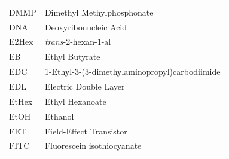 \documentclass[
  a4paper,
]{scrbook}
\begin{document}
\begin{table}[H]
\begin{tabular}{@{}p{} p{}@{}}
    DMMP  & Dimethyl Methylphosphonate  \\[5pt]
    DNA  & Deoxyribonucleic Acid  \\[5pt]
    E2Hex  & \textit{trans}-2-hexan-1-al  \\[5pt]
    EB  & Ethyl Butyrate  \\[5pt]
    EDC  & 1-Ethyl-3-(3-dimethylaminopropyl)carbodiimide  \\[5pt]
    EDL  & Electric Double Layer  \\[5pt]
    EtHex  & Ethyl Hexanoate  \\[5pt]
    EtOH  & Ethanol  \\[5pt]
    FET  & Field-Effect Transistor  \\[5pt]
    FITC  & Fluorescein isothiocyanate  \\[5pt]
  \end{tabular}
\end{table}
\end{document}

